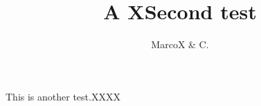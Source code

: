 \documentclass[DIV=9,fontsize=10pt,oneside,paper=a5]{scrartcl}
\title{A XSecond test}
\date{}
\author{MarcoX \& C.}
\begin{document}
\maketitle




This is another test.XXXX



\cleardoublepage

\thispagestyle{empty}
\strut
\vfill

\begin{center}





\end{center}
\end{document}
